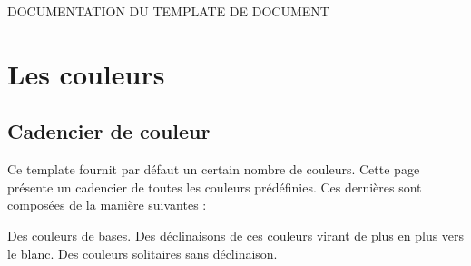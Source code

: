 \documentclass[11pt,a4paper,rgb]{report}
\begin{document}
{\Large
\begin{center}
DOCUMENTATION DU TEMPLATE DE DOCUMENT
\vspace*{.4cm}
\end{center}
}

\section{Les couleurs}
\subsection{Cadencier de couleur}
Ce template fournit par défaut un certain nombre de couleurs. Cette page présente un cadencier de toutes les couleurs prédéfinies. Ces dernières sont composées de la manière suivantes :
\begin{itemize}
	\itemperso{}Des couleurs de bases.
	\itemperso{}Des déclinaisons de ces couleurs virant de plus en plus vers le blanc.
	\itemperso{}Des couleurs solitaires sans déclinaison.
\end{itemize}
\begin{multicols}{4}
	\noindent{}%
	\end{multicols}
\end{document}
